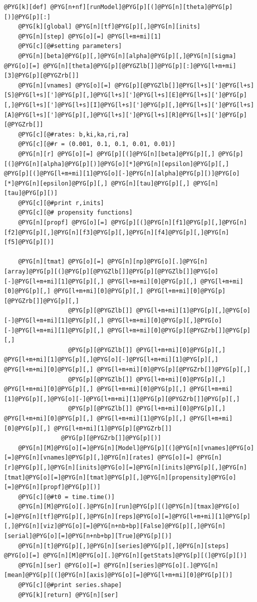 \documentclass[a4paper,10pt,english]{manual}
\begin{document}
\begin{Verbatim}[commandchars=@\[\]]
@PYG[k][def] @PYG[n+nf][runModel]@PYG[p][(]@PYG[n][theta]@PYG[p][)]@PYG[p][:]
    @PYG[k][global] @PYG[n][tf]@PYG[p][,]@PYG[n][inits]
    @PYG[n][step] @PYG[o][=] @PYG[l+m+mi][1]
    @PYG[c][@#setting parameters]
    @PYG[n][beta]@PYG[p][,]@PYG[n][alpha]@PYG[p][,]@PYG[n][sigma] @PYG[o][=] @PYG[n][theta]@PYG[p][@PYGZlb[]]@PYG[p][:]@PYG[l+m+mi][3]@PYG[p][@PYGZrb[]]
    @PYG[n][vnames] @PYG[o][=] @PYG[p][@PYGZlb[]]@PYG[l+s][']@PYG[l+s][S]@PYG[l+s][']@PYG[p][,]@PYG[l+s][']@PYG[l+s][E]@PYG[l+s][']@PYG[p][,]@PYG[l+s][']@PYG[l+s][I]@PYG[l+s][']@PYG[p][,]@PYG[l+s][']@PYG[l+s][A]@PYG[l+s][']@PYG[p][,]@PYG[l+s][']@PYG[l+s][R]@PYG[l+s][']@PYG[p][@PYGZrb[]]
    @PYG[c][@#rates: b,ki,ka,ri,ra]
    @PYG[c][@#r = (0.001, 0.1, 0.1, 0.01, 0.01)]
    @PYG[n][r] @PYG[o][=] @PYG[p][(]@PYG[n][beta]@PYG[p][,] @PYG[p][(]@PYG[n][alpha]@PYG[p][)]@PYG[o][*]@PYG[n][epsilon]@PYG[p][,] @PYG[p][(]@PYG[l+m+mi][1]@PYG[o][-]@PYG[n][alpha]@PYG[p][)]@PYG[o][*]@PYG[n][epsilon]@PYG[p][,] @PYG[n][tau]@PYG[p][,] @PYG[n][tau]@PYG[p][)]
    @PYG[c][@#print r,inits]
    @PYG[c][@# propensity functions]
    @PYG[n][propf] @PYG[o][=] @PYG[p][(]@PYG[n][f1]@PYG[p][,]@PYG[n][f2]@PYG[p][,]@PYG[n][f3]@PYG[p][,]@PYG[n][f4]@PYG[p][,]@PYG[n][f5]@PYG[p][)]

    @PYG[n][tmat] @PYG[o][=] @PYG[n][np]@PYG[o][.]@PYG[n][array]@PYG[p][(]@PYG[p][@PYGZlb[]]@PYG[p][@PYGZlb[]]@PYG[o][-]@PYG[l+m+mi][1]@PYG[p][,] @PYG[l+m+mi][0]@PYG[p][,] @PYG[l+m+mi][0]@PYG[p][,] @PYG[l+m+mi][0]@PYG[p][,] @PYG[l+m+mi][0]@PYG[p][@PYGZrb[]]@PYG[p][,]
                  @PYG[p][@PYGZlb[]] @PYG[l+m+mi][1]@PYG[p][,]@PYG[o][-]@PYG[l+m+mi][1]@PYG[p][,] @PYG[l+m+mi][0]@PYG[p][,]@PYG[o][-]@PYG[l+m+mi][1]@PYG[p][,] @PYG[l+m+mi][0]@PYG[p][@PYGZrb[]]@PYG[p][,]
                  @PYG[p][@PYGZlb[]] @PYG[l+m+mi][0]@PYG[p][,] @PYG[l+m+mi][1]@PYG[p][,]@PYG[o][-]@PYG[l+m+mi][1]@PYG[p][,] @PYG[l+m+mi][0]@PYG[p][,] @PYG[l+m+mi][0]@PYG[p][@PYGZrb[]]@PYG[p][,]
                  @PYG[p][@PYGZlb[]] @PYG[l+m+mi][0]@PYG[p][,] @PYG[l+m+mi][0]@PYG[p][,] @PYG[l+m+mi][0]@PYG[p][,] @PYG[l+m+mi][1]@PYG[p][,]@PYG[o][-]@PYG[l+m+mi][1]@PYG[p][@PYGZrb[]]@PYG[p][,]
                  @PYG[p][@PYGZlb[]] @PYG[l+m+mi][0]@PYG[p][,] @PYG[l+m+mi][0]@PYG[p][,] @PYG[l+m+mi][1]@PYG[p][,] @PYG[l+m+mi][0]@PYG[p][,] @PYG[l+m+mi][1]@PYG[p][@PYGZrb[]]
                @PYG[p][@PYGZrb[]]@PYG[p][)]
    @PYG[n][M]@PYG[o][=]@PYG[n][Model]@PYG[p][(]@PYG[n][vnames]@PYG[o][=]@PYG[n][vnames]@PYG[p][,]@PYG[n][rates] @PYG[o][=] @PYG[n][r]@PYG[p][,]@PYG[n][inits]@PYG[o][=]@PYG[n][inits]@PYG[p][,]@PYG[n][tmat]@PYG[o][=]@PYG[n][tmat]@PYG[p][,]@PYG[n][propensity]@PYG[o][=]@PYG[n][propf]@PYG[p][)]
    @PYG[c][@#t0 = time.time()]
    @PYG[n][M]@PYG[o][.]@PYG[n][run]@PYG[p][(]@PYG[n][tmax]@PYG[o][=]@PYG[n][tf]@PYG[p][,]@PYG[n][reps]@PYG[o][=]@PYG[l+m+mi][1]@PYG[p][,]@PYG[n][viz]@PYG[o][=]@PYG[n+nb+bp][False]@PYG[p][,]@PYG[n][serial]@PYG[o][=]@PYG[n+nb+bp][True]@PYG[p][)]
    @PYG[n][t]@PYG[p][,]@PYG[n][series]@PYG[p][,]@PYG[n][steps] @PYG[o][=] @PYG[n][M]@PYG[o][.]@PYG[n][getStats]@PYG[p][(]@PYG[p][)]
    @PYG[n][ser] @PYG[o][=] @PYG[n][series]@PYG[o][.]@PYG[n][mean]@PYG[p][(]@PYG[n][axis]@PYG[o][=]@PYG[l+m+mi][0]@PYG[p][)]
    @PYG[c][@#print series.shape]
    @PYG[k][return] @PYG[n][ser]


\end{Verbatim}
\end{document}
